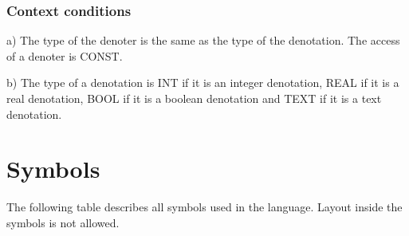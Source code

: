 \documentclass [a4paper,12pt,fleqn]{article}
\begin{document}
\subsubsection*{Context conditions}
\begin{list}{-}{}
\item[a)]
The type of the denoter is the same as the type of the
denotation. The access of a denoter is CONST.
\item[b)]
The type of a denotation is INT if it is an integer denotation,
REAL if it is a real denotation, BOOL if it is a boolean denotation and
TEXT if it is a text denotation.
\end{list}
\section {Symbols}
The following table describes all symbols used in the \ELAN language.
Layout inside the symbols is not allowed.
\end{document}
